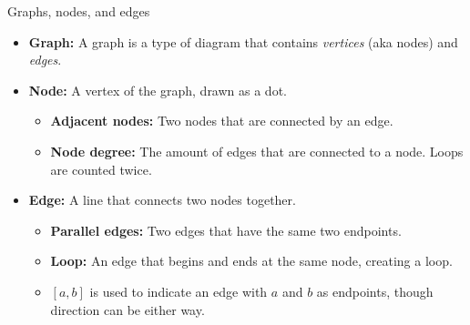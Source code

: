         \begin{intro}{Graphs, nodes, and edges}
            \footnotesize
            \begin{itemize}
                \item   \textbf{Graph:} A graph is a type of diagram that contains \textit{vertices} (aka nodes) and \textit{edges}.

                \begin{center}
                \end{center}

                \item   \textbf{Node:} A vertex of the graph, drawn as a dot.
                    \begin{itemize}
                        \item   \textbf{Adjacent nodes:} Two nodes that are connected by an edge.
                        \item   \textbf{Node degree:} The amount of edges that are connected to a node.
                            Loops are counted twice.
                    \end{itemize}

                \item   \textbf{Edge:} A line that connects two nodes together.
                    \begin{itemize}
                        \item   \textbf{Parallel edges:} Two edges that have
                            the same two endpoints.
                        \item   \textbf{Loop:} An edge that begins and ends at
                            the same node, creating a loop.
                        \item   $[a, b]$ is used to indicate an edge with $a$ and $b$ as endpoints,
                            though direction can be either way.
                    \end{itemize}
            \end{itemize}
        \end{intro}

